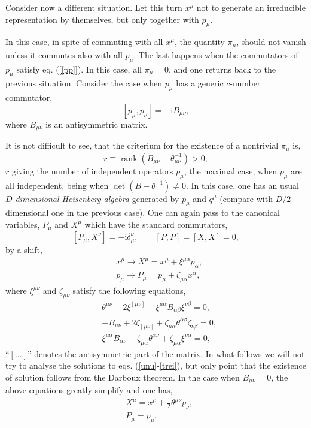 \documentclass[a4paper]{amsart}
\newcommand{\ii}{\mathrm{i}}
\newcommand{\rank}{\mathop{\mathrm{rank}}}
\begin{document}
Consider now a different situation. Let this turn $x^\mu$ not to
generate an irreducible representation by themselves, but only
together with $p_\mu$.

In this case, in spite of commuting with all $x^\mu$, the quantity
$\pi_\mu$, should not vanish unless it commutes also with all
$p_\mu$. The last happens when the commutators of $p_\mu$ satisfy
eq. (\ref{[pp]}). In this case, all $\pi_\mu=0$, and one returns
back to the previous situation. Consider the case when $p_\mu$ has
a generic $c$-number commutator,
\begin{equation}\label{B}
  [p_\mu,p_\nu]=-\ii B_{\mu\nu},
\end{equation}
where $B_{\mu\nu}$ is an antisymmetric matrix.

It is not difficult to see, that the criterium for the existence
of a nontrivial $\pi_\mu$ is,
\begin{equation}\label{rank}
  r\equiv\rank (B_{\mu\nu}-\theta^{-1}_{\mu\nu})>0,
\end{equation}
$r$ giving the number of independent operators $p_\mu$, the
maximal case, when $p_\mu$ are all independent, being when
$\det(B-\theta^{-1})\neq 0$. In this case, one has an usual
\emph{$D$-dimensional Heisenberg algebra} generated by $p_\mu$ and
$q^\mu$ (compare with $D/2$-dimensional one in the previous case).
One can again pass to the canonical variables, $P_\mu$ and $X^\mu$
which have the standard commutators,
\begin{equation}\label{stand}
  [P_\mu,X^\nu]=-\ii\delta_\mu^\nu,\qquad [P,P]=[X,X]=0,
\end{equation}
by a shift,
\begin{align}\label{shift-x}
  &x^\mu\rightarrow X^\mu=x^\mu+\xi^{\mu\alpha}p_\alpha, \\
  \label{shift-p}
  &p_\mu\rightarrow P_\mu=p_\mu+\zeta_{\mu\alpha}x^\alpha,
\end{align}
where $\xi^{\mu\nu}$ and $\zeta_{\mu\nu}$ satisfy the following
equations,
\begin{align}\label{unu}
  &\theta^{\mu\nu}-2\xi^{[\mu\nu]}-\xi^{\mu\alpha}B_{\alpha\beta}
  \xi^{\nu\beta}=0, \\ \label{doi}
  &-B_{\mu\nu}+2\zeta_{[\mu\nu]}+\zeta_{\mu\alpha}\theta^{\alpha\beta}
  \zeta_{\nu\beta}=0,\\ \label{trei}
  &\xi^{\mu\alpha}B_{\alpha\nu}+\zeta_{\mu\alpha}\theta^{\alpha\nu}
  +\zeta_{\mu\alpha}\xi^{\nu\alpha}=0,
\end{align}
``$[\dots]$'' denotes the antisymmetric part of the matrix. In
what follows we will not try to analyse the solutions to eqs.
(\ref{unu}-\ref{trei}), but only point that the existence of
solution follows from the Darboux theorem. In the case when
$B_{\mu\nu}=0$, the above equations greatly simplify and one has,
\begin{align}\label{b=0}
  &X^\mu=x^\mu+\frac{1}{2}\theta^{\mu\nu}p_\nu, \\
  &P_\mu=p_\mu.
\end{align}
\end{document}
